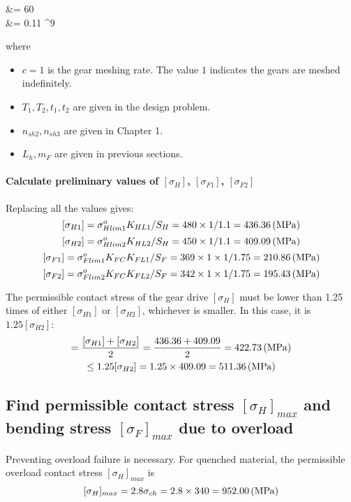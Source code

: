 \begin{itemize}
\begin{flalign*}
	&= 60     \\
	&= 0.11 ^9
	\end{flalign*}
	where\begin{itemize}
		\item $ c=1 $ is the gear meshing rate. The value $ 1 $ indicates the gears are meshed indefinitely.
		\item $ T_1,T_2,t_1,t_2 $ are given in the design problem.
		\item $ n_{sh2}, n_{sh3} $ are given in Chapter 1.
		\item $ L_h, m_F $ are given in previous sections.
	\end{itemize}
\end{itemize}

\paragraph{Calculate preliminary values of $ [\sigma_H] $, $ [\sigma_{F1}] $, $ [\sigma_{F2}] $} Replacing all the values gives:\\
\[ [\sigma_{H1}] = \sigma_{Hlim1}^oK_{HL1}/S_H = 480\times 1/1.1 = 436.36 \, (\mathrm{MPa})\]
\[ [\sigma_{H2}] = \sigma_{Hlim2}^oK_{HL2}/S_H = 450\times 1/1.1 = 409.09 \, (\mathrm{MPa})\]
\[ [\sigma_{F1}] = \sigma_{Flim1}^oK_{FC}K_{FL1}/S_F = 369\times 1\times 1/1.75  = 210.86\, (\mathrm{MPa})\]
\[ [\sigma_{F2}] = \sigma_{Flim2}^oK_{FC}K_{FL2}/S_F = 342\times 1\times 1/1.75  = 195.43 \, (\mathrm{MPa})\]

The permissible contact stress of the gear drive $ [\sigma_H] $ must be lower than 1.25 times of either $ [\sigma_{H1}] $ or $ [\sigma_{H2}] $, whichever is smaller. In this case, it is $ 1.25[\sigma_{H2}]$:
\begin{multline*}
[\sigma_H] =\dfrac{[\sigma_{H1}]+[\sigma_{H2}]}{2}= \dfrac{436.36+409.09}{2} = 422.73 \unitp{MPa}\\
\leq 1.25[\sigma_{H2}] = 1.25\times 409.09= 511.36\unitp{MPa}
\end{multline*}

\subsection{Find permissible contact stress $ [\sigma_H]_{max} $ and bending stress $ [\sigma_F]_{max} $ due to overload}
Preventing overload failure is necessary. For quenched material, the permissible overload contact stress $ [\sigma_H]_{max} $ is
\[ [\sigma_H]_{max} = 2.8\sigma_{ch} = 2.8\times 340 = 952.00\, (\mathrm{MPa}) \]

